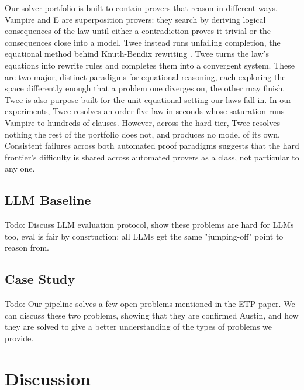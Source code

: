 \documentclass[letterpaper]{article} %
\begin{document}
Our solver portfolio is built to contain provers that reason in different ways. Vampire and E are superposition provers: they search by deriving logical consequences of the law until either a contradiction proves it trivial or the consequences close into a model. Twee instead runs unfailing completion, the equational method behind Knuth-Bendix rewriting \citep{...}. Twee turns the law's equations into rewrite rules and completes them into a convergent system. These are two major, distinct paradigms for equational reasoning, each exploring the space differently enough that a problem one diverges on, the other may finish. Twee is also purpose-built for the unit-equational setting our laws fall in. In our experiments, Twee resolves an order-five law in seconds whose saturation runs Vampire to hundreds of clauses. However, across the hard tier, Twee resolves nothing the rest of the portfolio does not, and produces no model of its own. Consistent failures across both automated proof paradigms suggests that the hard frontier's difficulty is shared across automated provers as a class, not particular to any one. 



\subsection{LLM Baseline}
Todo: Discuss LLM evaluation protocol, show these problems are hard for LLMs too, eval is fair by consrtuction: all LLMs get the same "jumping-off" point to reason from. 

\subsection{Case Study}
Todo:
Our pipeline solves a few open problems mentioned in the ETP paper. We can discuss these two problems, showing that they are confirmed Austin, and how they are solved to give a better understanding of the types of problems we provide. 





\section{Discussion}




% 
\end{document}
